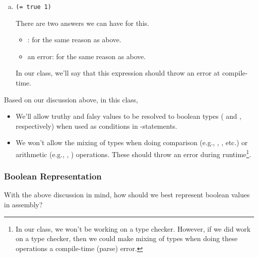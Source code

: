 \documentclass[letterpaper]{article}
\begin{document}
\begin{mdframed}
\begin{enumerate}[a.]
        \item \begin{verbatim}
(= true 1)\end{verbatim}

        \begin{mdframed}
            There are two answers we can have for this. 
            \begin{itemize}
                \item {}: for the same reason as above.
                \item an error: for the same reason as above. 
            \end{itemize}
            In our class, we'll say that this expression should throw an error at compile-time.
        \end{mdframed}
    \end{enumerate}
\end{mdframed}
Based on our discussion above, in this class, 
\begin{itemize}
    \item We'll allow truthy and falsy values to be resolved to boolean types ( and , respectively) when used as conditions in -statements.
    \item We won't allow the mixing of types when doing comparison (e.g., \code{=}, \code{<}, etc.) or arithmetic (e.g., \code{+}, \code{-}) operations. These should throw an error during runtime\footnote{In our class, we won't be working on a type checker. However, if we did work on a type checker, then we could make mixing of types when doing these operations a compile-time (parse) error.}.
\end{itemize}

\subsubsection{Boolean Representation}
With the above discussion in mind, how should we best represent boolean values in assembly?
\end{document}
